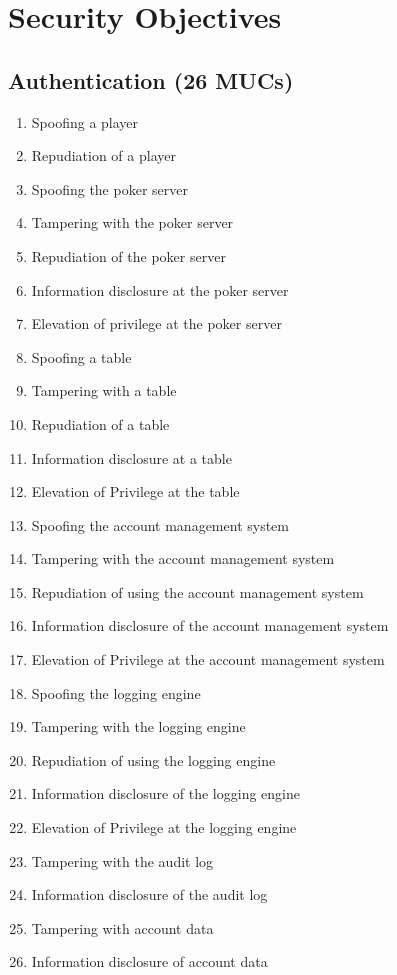 \documentclass[a4paper,11pt]{report}
\begin{document}
\section{Security Objectives}
\label{MUCLabels}

\subsection{Authentication (26 MUCs)}
\begin{enumerate}
\item Spoofing a player
\item Repudiation of a player
\item Spoofing the poker server
\item Tampering with the poker server
\item Repudiation of the poker server
\item Information disclosure at the poker server
\item Elevation of privilege at the poker server
\item Spoofing a table
\item Tampering with a table
\item Repudiation of a table 
\item Information disclosure at a table 
\item Elevation of Privilege at the table
\item Spooﬁng the account management system
\item Tampering with the account management system
\item Repudiation of using the account management system
\item Information disclosure of the account management system
\item Elevation of Privilege at the account management system
\item Spooﬁng the logging engine
\item Tampering with the logging engine 
\item Repudiation of using the logging engine
\item Information disclosure of the logging engine 
\item Elevation of Privilege at the logging engine
\item Tampering with the audit log
\item Information disclosure of the audit log
\item Tampering with account data
\item Information disclosure of account data 
\end{enumerate}
\end{document}

